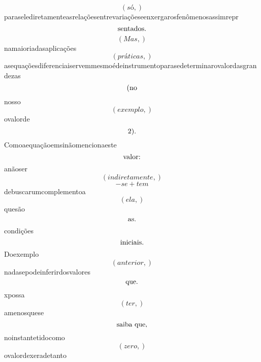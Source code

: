 \documentclass{article}
\begin{document}
\begin{equation}
\left( só,\right)
\end{equation}paraselediretamenteasrelaçõesentrevariaçõeseenxergarosfenômenosassimrepr\begin{equation}
$sentados.$
\end{equation}\begin{equation}
\left( Mas,\right)
\end{equation}namaioriadasaplicações\begin{equation}
\left( práticas,\right)
\end{equation}asequaçõesdiferenciaiservemmesmoédeinstrumentoparasedeterminarovalordasgrandezas\begin{equation}
$(no$
\end{equation}nosso\begin{equation}
\left( exemplo,\right)
\end{equation}ovalorde\begin{equation}
$2).$
\end{equation}Comoaequaçãoemsinãomencionaeste\begin{equation}
$valor:$
\end{equation}anãoser\begin{equation}
\left( indiretamente,\right)
\end{equation}\begin{equation}
- se + tem
\end{equation}debuscarumcomplementoa\begin{equation}
\left( ela,\right)
\end{equation}quesão\begin{equation}
$as.$
\end{equation}condições\begin{equation}
$iniciais.$
\end{equation}Doexemplo\begin{equation}
\left( anterior,\right)
\end{equation}nadasepodeinferirdosvalores\begin{equation}
$que.$
\end{equation}xpossa\begin{equation}
\left( ter,\right)
\end{equation}amenosquese\begin{equation}
$saiba que,$
\end{equation}noinstantetidocomo\begin{equation}
\left( zero,\right)
\end{equation}ovalordexeradetanto\begin{equation}

\end{equation}
\end{document}
